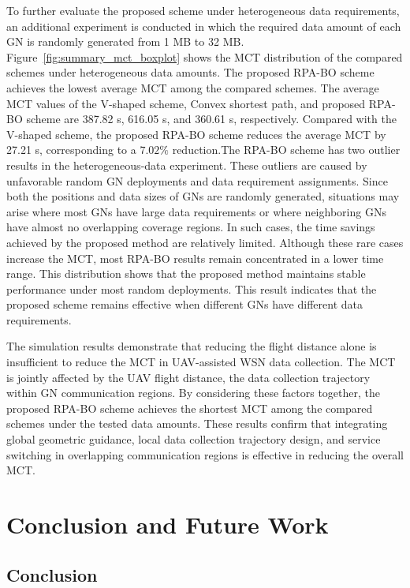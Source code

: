 \documentclass[12pt]{ksthesis}
\begin{document}
\begin{thesis}
{    To further evaluate the proposed scheme under heterogeneous data requirements, an additional experiment is conducted in which the required data amount of each GN is randomly generated from 1 MB to 32 MB. Figure~\ref{fig:summary_mct_boxplot} shows the MCT distribution of the compared schemes under heterogeneous data amounts. The proposed RPA-BO scheme achieves the lowest average MCT among the compared schemes. The average MCT values of the V-shaped scheme, Convex shortest path, and proposed RPA-BO scheme are 387.82 s, 616.05 s, and 360.61 s, respectively. Compared with the V-shaped scheme, the proposed RPA-BO scheme reduces the average MCT by 27.21 s, corresponding to a \(7.02\%\) reduction.The RPA-BO scheme has two outlier results in the heterogeneous-data experiment. These outliers are caused by unfavorable random GN deployments and data requirement assignments. Since both the positions and data sizes of GNs are randomly generated, situations may arise where most GNs have large data requirements or where neighboring GNs have almost no overlapping coverage regions. In such cases, the time savings achieved by the proposed method are relatively limited. Although these rare cases increase the MCT, most RPA-BO results remain concentrated in a lower time range. This distribution shows that the proposed method maintains stable performance under most random deployments. This result indicates that the proposed scheme remains effective when different GNs have different data requirements.

    The simulation results demonstrate that reducing the flight distance alone is insufficient to reduce the MCT in UAV-assisted WSN data collection. The MCT is jointly affected by the UAV flight distance, the data collection trajectory within GN communication regions. By considering these factors together, the proposed RPA-BO scheme achieves the shortest MCT among the compared schemes under the tested data amounts. These results confirm that integrating global geometric guidance, local data collection trajectory design, and service switching in overlapping communication regions is effective in reducing the overall MCT.    


\chapter{Conclusion and Future Work} \label{Chap:Conclusion}

\section{Conclusion}

}
\end{thesis}
\end{document}
